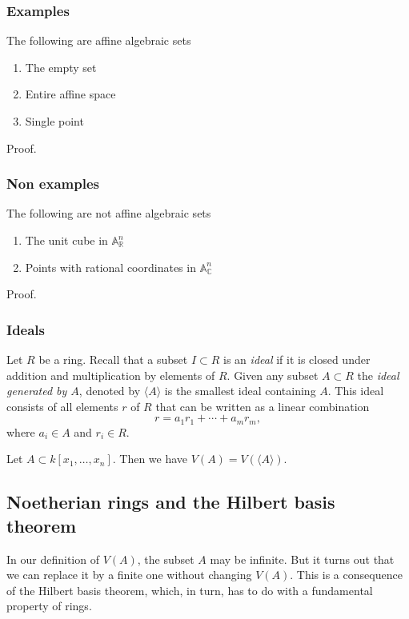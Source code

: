 \documentclass[11pt]{article}
\begin{document}
\subsubsection{Examples}
\label{sec:org137adac}
The following are affine algebraic sets
\begin{enumerate}
\item The empty set
\item Entire affine space
\item Single point
\end{enumerate}
\begin{skipped}
Proof.
\end{skipped}

\subsubsection{Non examples}
\label{sec:orgdb3f223}
The following are not affine algebraic sets
\begin{enumerate}
\item The unit cube in \(\mathbb A^n_{{\mathbb R}}\)
\item Points with rational coordinates in \(\mathbb A^n_{{\mathbb C}}\)
\end{enumerate}
\begin{skipped}
Proof.
\end{skipped}

\subsubsection{Ideals}
\label{sec:org1bb638e}
Let \(R\) be a ring.
Recall that a subset \(I \subset R\) is an \emph{ideal} if it is closed under addition and multiplication by elements of \(R\).
Given any subset \(A \subset R\) the \emph{ideal generated by \(A\)}, denoted by \(\langle A \rangle\) is the smallest ideal containing \(A\).
This ideal consists of all elements \(r\) of  \(R\) that can be written as a linear combination
\[ r = a_1 r_1 + \cdots + a_m r_m,\]
where \(a_i \in A\) and \(r_i \in R\).

\begin{proposition}
Let \(A \subset k[x_1,\dots,x_n]\). Then we have \(V(A) = V(\langle A \rangle)\).
\end{proposition}

\subsection{Noetherian rings and the Hilbert basis theorem}
\label{sec:org451a36f}
In our definition of \(V(A)\), the subset \(A\) may be infinite. 
But it turns out that we can replace it by a finite one without changing \(V(A)\).
This is a consequence of the Hilbert basis theorem, which, in turn, has to do with a fundamental property of rings.
\end{document}
